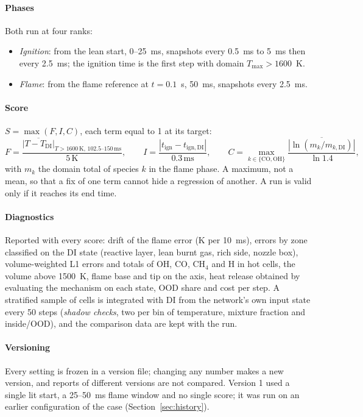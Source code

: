 \documentclass[preprint,review,12pt]{elsarticle}
\begin{document}
\paragraph{Phases} Both run at four ranks:
\begin{itemize}
\item \emph{Ignition}: from the lean start, 0--25~ms, snapshots every 0.5~ms to 5~ms then every 2.5~ms; the
  ignition time is the first step with domain $T_\mathrm{max}>1600$~K.
\item \emph{Flame}: from the flame reference at $t=0.1$~s, 50~ms, snapshots every 2.5~ms.
\end{itemize}

\paragraph{Score} $S=\max(F,I,C)$, each term equal to 1 at its target:
\begin{equation}
F=\frac{\overline{|T-T_\mathrm{DI}|}_{T>1600\,\mathrm{K},\,102.5\text{--}150\,\mathrm{ms}}}{5\,\mathrm{K}},\qquad
I=\frac{|t_\mathrm{ign}-t_\mathrm{ign,DI}|}{0.3\,\mathrm{ms}},\qquad
C=\max_{k\in\{\mathrm{CO,OH}\}}\frac{\overline{|\ln(m_k/m_{k,\mathrm{DI}})|}}{\ln 1.4},
\end{equation}
with $m_k$ the domain total of species $k$ in the flame phase. A maximum, not a mean, so that a fix of one term
cannot hide a regression of another. A run is valid only if it reaches its end time.

\paragraph{Diagnostics} Reported with every score: drift of the flame error (K per 10~ms), errors by zone
classified on the DI state (reactive layer, lean burnt gas, rich side, nozzle box), volume-weighted L1 errors
and totals of OH, CO, CH$_4$ and H in hot cells, the volume above 1500~K, flame base and tip on the axis, heat
release obtained by evaluating the mechanism on each state, OOD share and cost per step. A stratified sample of
cells is integrated with DI from the network's own input state every 50 steps (\emph{shadow checks}, two per bin
of temperature, mixture fraction and inside/OOD), and the comparison data are kept with the run.

\paragraph{Versioning} Every setting is frozen in a version file; changing any number makes a new version, and
reports of different versions are not compared. Version 1 used a single lit start, a 25--50~ms flame window and
no single score; it was run on an earlier configuration of the case (Section~\ref{sec:history}).
\end{document}
